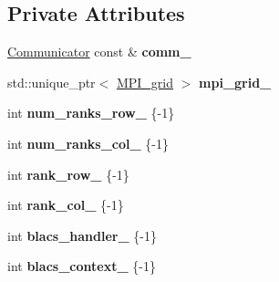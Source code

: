 \subsection*{Private Attributes}
\begin{DoxyCompactItemize}
\item 
\hypertarget{classsddk_1_1_b_l_a_c_s__grid_aaf61cb04d9b70da0587d6ad90669f9c2}{}\hyperlink{classsddk_1_1_communicator}{Communicator} const \& {\bfseries comm\+\_\+}\label{classsddk_1_1_b_l_a_c_s__grid_aaf61cb04d9b70da0587d6ad90669f9c2}

\item 
\hypertarget{classsddk_1_1_b_l_a_c_s__grid_aabfd4f9d24abfdf10295287f45e91046}{}std\+::unique\+\_\+ptr$<$ \hyperlink{classsddk_1_1_m_p_i__grid}{M\+P\+I\+\_\+grid} $>$ {\bfseries mpi\+\_\+grid\+\_\+}\label{classsddk_1_1_b_l_a_c_s__grid_aabfd4f9d24abfdf10295287f45e91046}

\item 
\hypertarget{classsddk_1_1_b_l_a_c_s__grid_ab3faecd1bb84d398f3bc20397e2f96b3}{}int {\bfseries num\+\_\+ranks\+\_\+row\+\_\+} \{-\/1\}\label{classsddk_1_1_b_l_a_c_s__grid_ab3faecd1bb84d398f3bc20397e2f96b3}

\item 
\hypertarget{classsddk_1_1_b_l_a_c_s__grid_a794a8eb8ebc1021a67a7e768a4c9c21e}{}int {\bfseries num\+\_\+ranks\+\_\+col\+\_\+} \{-\/1\}\label{classsddk_1_1_b_l_a_c_s__grid_a794a8eb8ebc1021a67a7e768a4c9c21e}

\item 
\hypertarget{classsddk_1_1_b_l_a_c_s__grid_ad2aea64d80c10f8e3535daff1e717520}{}int {\bfseries rank\+\_\+row\+\_\+} \{-\/1\}\label{classsddk_1_1_b_l_a_c_s__grid_ad2aea64d80c10f8e3535daff1e717520}

\item 
\hypertarget{classsddk_1_1_b_l_a_c_s__grid_a2c36753b53bba68c8ced1dc398fed15e}{}int {\bfseries rank\+\_\+col\+\_\+} \{-\/1\}\label{classsddk_1_1_b_l_a_c_s__grid_a2c36753b53bba68c8ced1dc398fed15e}

\item 
\hypertarget{classsddk_1_1_b_l_a_c_s__grid_ae07df030cbaf61d0db60d29b9c67e594}{}int {\bfseries blacs\+\_\+handler\+\_\+} \{-\/1\}\label{classsddk_1_1_b_l_a_c_s__grid_ae07df030cbaf61d0db60d29b9c67e594}

\item 
\hypertarget{classsddk_1_1_b_l_a_c_s__grid_a9b1e858f4bdcd53b1f2c48ca1fc63619}{}int {\bfseries blacs\+\_\+context\+\_\+} \{-\/1\}\label{classsddk_1_1_b_l_a_c_s__grid_a9b1e858f4bdcd53b1f2c48ca1fc63619}

\end{DoxyCompactItemize}


